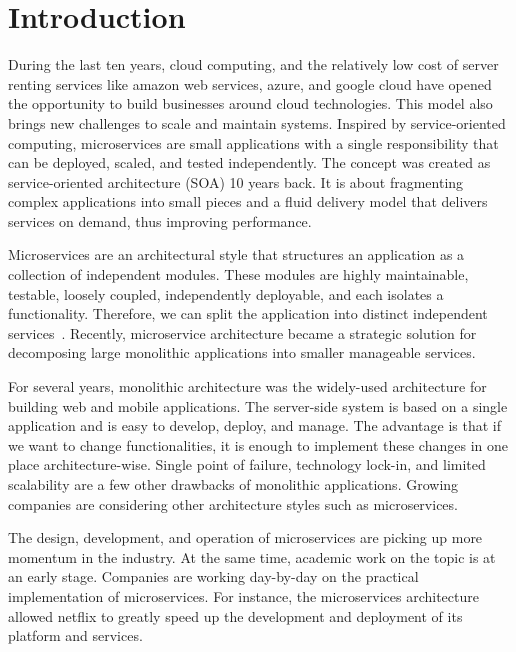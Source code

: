 
\section{Introduction}

During the last ten years, cloud computing, and the relatively low cost of server renting services like amazon web services, azure, and google cloud have opened the opportunity to build businesses around cloud technologies. This model also brings new challenges to scale and maintain systems.\cite{Claus2016} Inspired by service-oriented computing, microservices are small applications with a single responsibility that can be deployed, scaled, and tested independently. The concept was created as service-oriented architecture (SOA) 10 years back. It is about fragmenting complex applications into small pieces and a fluid delivery model that delivers services on demand, thus improving performance.\cite{Larrucea2018}

Microservices are an architectural style that structures an application as a collection of independent modules. These modules are highly maintainable, testable, loosely coupled, independently deployable, and each isolates a functionality. Therefore, we can split the application into distinct independent services~\cite{thones2015}. Recently, microservice architecture became a strategic solution for decomposing large monolithic applications into smaller manageable services.\cite{Taibi2019} 

For several years, monolithic architecture was the widely-used architecture for building web and mobile applications. The server-side system is based on a single application and is easy to develop, deploy, and manage.\cite{Danbettinger2019} The advantage is that if we want to change functionalities, it is enough to implement these changes in one place architecture-wise.\cite{Pavlovic2020} Single point of failure, technology lock-in, and limited scalability are a few other drawbacks of monolithic applications. Growing companies are considering other architecture styles such as microservices.\cite{Lenga2019, Jag2017, Rodrigue2016}

The design, development, and operation of microservices are picking up more momentum in the industry. At the same time, academic work on the topic is at an early stage.\cite{Soldani2018, Dragoni2017, Olaf2016} 
Companies are working day-by-day on the practical implementation of microservices.\cite{Kevin2015, Alpers2015} For instance, the microservices architecture allowed netflix\cite{Meshenberg2016} to greatly speed up the development and deployment of its platform and services.

